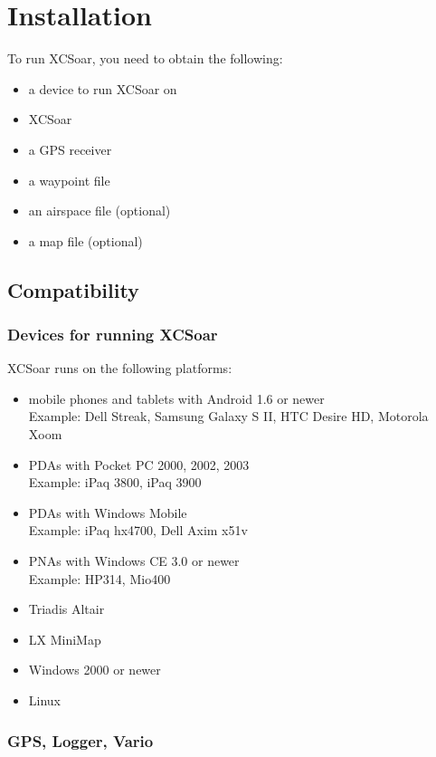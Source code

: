 \chapter{Installation}\label{cha:installation}

To run XCSoar, you need to obtain the following:

\begin{itemize}
\item a device to run XCSoar on
\item XCSoar
\item a GPS receiver
\item a waypoint file
\item an airspace file (optional)
\item a map file (optional)
\end{itemize}

\section{Compatibility}

\subsection{Devices for running XCSoar}

XCSoar runs on the following platforms:

\begin{itemize}
\item mobile phones and tablets with Android 1.6 or newer \\
  Example: Dell Streak, Samsung Galaxy S II, HTC Desire HD,
  Motorola Xoom
\item PDAs with Pocket PC 2000, 2002, 2003 \\
  Example: iPaq 3800, iPaq 3900
\item PDAs with Windows Mobile \\
  Example: iPaq hx4700, Dell Axim x51v
\item PNAs with Windows CE 3.0 or newer \\
  Example: HP314, Mio400
\item Triadis Altair
\item LX MiniMap
\item Windows 2000 or newer
\item Linux
\end{itemize}

\subsection{GPS, Logger, Vario}

